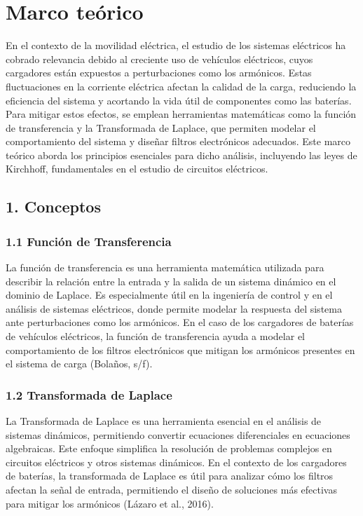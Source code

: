 \section{Marco te\'orico}
\label{sec:marco_teorico}

En el contexto de la movilidad el\'ectrica, el estudio de los sistemas el\'ectricos ha cobrado relevancia debido al creciente uso de veh\'iculos el\'ectricos, cuyos cargadores est\'an expuestos a perturbaciones como los arm\'onicos. Estas fluctuaciones en la corriente el\'ectrica afectan la calidad de la carga, reduciendo la eficiencia del sistema y acortando la vida \'util de componentes como las bater\'ias. Para mitigar estos efectos, se emplean herramientas matem\'aticas como la funci\'on de transferencia y la Transformada de Laplace, que permiten modelar el comportamiento del sistema y dise\~nar filtros electr\'onicos adecuados. Este marco te\'orico aborda los principios esenciales para dicho an\'alisis, incluyendo las leyes de Kirchhoff, fundamentales en el estudio de circuitos el\'ectricos.

\subsection{1. Conceptos}

\subsubsection{1.1 Funci\'on de Transferencia}
La funci\'on de transferencia es una herramienta matem\'atica utilizada para describir la relaci\'on entre la entrada y la salida de un sistema din\'amico en el dominio de Laplace. Es especialmente \'util en la ingenier\'ia de control y en el an\'alisis de sistemas el\'ectricos, donde permite modelar la respuesta del sistema ante perturbaciones como los arm\'onicos. En el caso de los cargadores de bater\'ias de veh\'iculos el\'ectricos, la funci\'on de transferencia ayuda a modelar el comportamiento de los filtros electr\'onicos que mitigan los arm\'onicos presentes en el sistema de carga (Bola\~nos, s/f).

\subsubsection{1.2 Transformada de Laplace}
La Transformada de Laplace es una herramienta esencial en el an\'alisis de sistemas din\'amicos, permitiendo convertir ecuaciones diferenciales en ecuaciones algebraicas. Este enfoque simplifica la resoluci\'on de problemas complejos en circuitos el\'ectricos y otros sistemas din\'amicos. En el contexto de los cargadores de bater\'ias, la transformada de Laplace es \'util para analizar c\'omo los filtros afectan la se\~nal de entrada, permitiendo el dise\~no de soluciones m\'as efectivas para mitigar los arm\'onicos (L\'azaro et al., 2016).


